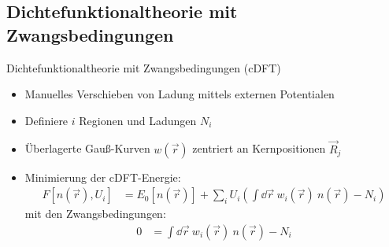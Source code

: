\subsection{Dichtefunktionaltheorie mit Zwangsbedingungen}
\begin{frame}{Dichtefunktionaltheorie mit Zwangsbedingungen (cDFT)}
\hspace*{-.5cm}
\begin{minipage}{0.75\textwidth}
	\vspace*{-1.5cm}
	\begin{itemize}
		\item Manuelles Verschieben von Ladung mittels externen Potentialen
		\item Definiere $i$ Regionen und Ladungen $N_i$
		\item Überlagerte Gauß-Kurven $w(\vec{r})$ zentriert an Kernpositionen $\vec{R}_j$
	\end{itemize}
\end{minipage}
\begin{minipage}{0.25\textwidth}
	\vspace*{-.8cm}
\end{minipage}
\hspace*{-.5cm}
\begin{minipage}{\textwidth}
\vspace*{-1cm}
\begin{itemize}
	\item Minimierung der cDFT-Energie:
	\begin{align*}
	F\left[n\left(\vec{r}\right), U_i\right] &= E_0\left[n\left(\vec{r}\right)\right] + 
	\sum_i U_i\left(\int\dd\vec{r}\ w_i\left(\vec{r}\right)\ n\left(\vec{r}\right) - N_i\right)
	\end{align*}
	mit den Zwangsbedingungen:
	\begin{align*}
	0 &= \int\dd\vec{r}\ w_i\left(\vec{r}\right)\ n\left(\vec{r}\right) - N_i
	\end{align*}
\end{itemize}
\end{minipage}
\end{frame}

